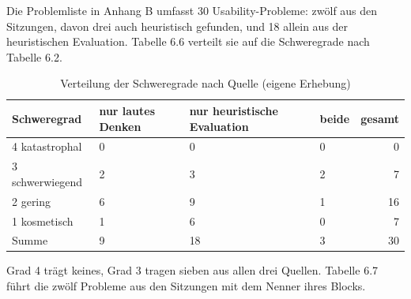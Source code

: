 Die Problemliste in Anhang B umfasst 30 Usability-Probleme: zwölf aus den Sitzungen, davon drei auch heuristisch gefunden, und 18 allein aus der heuristischen Evaluation. Tabelle 6.6 verteilt sie auf die Schweregrade nach Tabelle 6.2.

\begin{table}[htbp]
	\centering
	\small
	\caption[Verteilung der Schweregrade nach Quelle]{Verteilung der Schweregrade nach Quelle (eigene Erhebung)}
	\label{tab:schweregrad-verteilung}
	\begin{tabularx}{\textwidth}{@{}L{4.2cm}YYYr@{}}
		\toprule
		\textbf{Schweregrad} & \textbf{nur lautes Denken} & \textbf{nur heuristische Evaluation} & \textbf{beide} & \textbf{gesamt} \\
		 katastrophal & 0 & 0 & 0 & 0 \\
		3 schwerwiegend & 2 & 3 & 2 & 7 \\
		2 gering & 6 & 9 & 1 & 16 \\
		1 kosmetisch & 1 & 6 & 0 & 7 \\
		\midrule
		Summe & 9 & 18 & 3 & 30 \\
		\bottomrule
	\end{tabularx}
\end{table}

Grad 4 trägt keines, Grad 3 tragen sieben aus allen drei Quellen. Tabelle 6.7 führt die zwölf Probleme aus den Sitzungen mit dem Nenner ihres Blocks.

